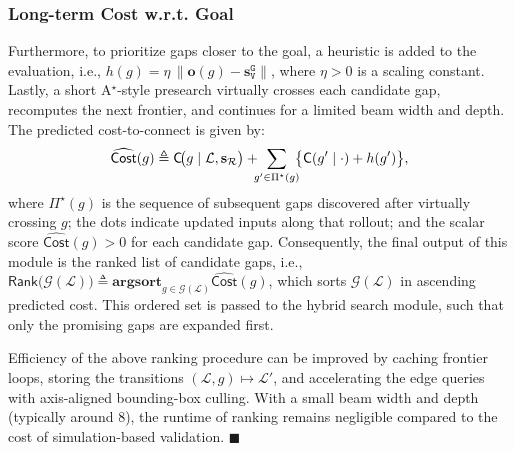 \subsubsection{Long-term Cost w.r.t. Goal}
Furthermore, to prioritize gaps closer to the goal, a heuristic is added to the evaluation,
i.e.,
$h(g)=\eta\,\big\|\mathbf{o}(g)-\mathbf{s}_\texttt{V}^{\texttt{G}}\big\|$,
where $\eta>0$ is a scaling constant. Lastly, a short A$^\star$-style presearch virtually crosses
each candidate gap, recomputes the next frontier, and continues for a limited
beam width and depth. The predicted cost-to-connect is given by:
\begin{equation}\label{eq:pred_cost}
\widehat{\mathsf{Cost}}(g)\triangleq
\mathsf{C}\!\big(g \mid \mathcal{L},\mathbf{s}_{\mathcal{R}}\big)
+\!\!\!\sum_{g'\in\Pi^\star(g)}\!\!\!\big{\{}\mathsf{C}(g' \mid \cdot)+h(g')\big{\}},
\end{equation}
where $\Pi^\star(g)$ is the sequence of subsequent gaps discovered after
virtually crossing $g$;
the dots indicate updated inputs along that rollout;
and the scalar score $\widehat{\mathsf{Cost}}(g)>0$ for each candidate gap.
Consequently,
the final output of this module is the ranked list of candidate gaps, i.e.,
$\textsf{Rank}\big(\mathcal{G}(\mathcal{L})\big)
\triangleq \textbf{argsort}_{g\in\mathcal{G}(\mathcal{L})}\widehat{\mathsf{Cost}}(g)$,
which sorts $\mathcal{G}(\mathcal{L})$ in ascending predicted cost. This
ordered set is passed to the hybrid search module, such that only the
promising gaps are expanded first.

\begin{remark}\label{remark:gap}
Efficiency of the above ranking procedure can be improved by
caching frontier loops, storing the transitions
$(\mathcal{L},g)\mapsto\mathcal{L}'$, and accelerating the edge queries with
axis-aligned bounding-box culling. With a small beam width and depth
(typically around $8$), the runtime of ranking remains negligible compared to
the cost of simulation-based validation. \hfill$\blacksquare$
\end{remark}





